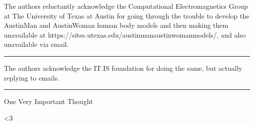 \documentclass[paper.tex]{subfiles}
\begin{document}
The authors reluctantly acknowledge the Computational Electromagnetics Group at The University of Texas at Austin for going through the trouble to develop the AustinMan and AustinWoman human body models and then making them unavailable at https://sites.utexas.edu/austinmanaustinwomanmodels/, and also unavailable via email.

\rule{\linewidth}{0.2pt}

The authors acknowledge the IT.IS foundation for doing the same, but actually replying to emails.

\rule{\linewidth}{0.2pt}

One Very Important Thought



{\Large <3}
\end{document}
